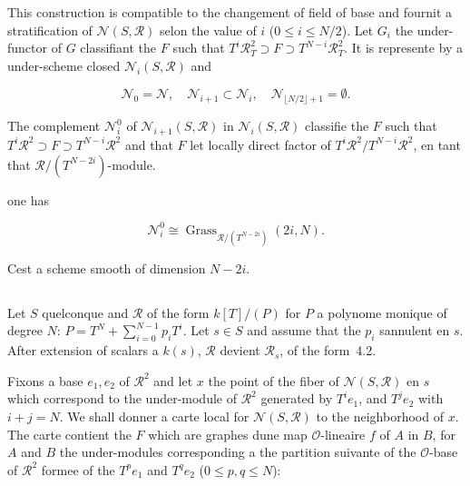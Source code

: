 \documentclass[11pt,a4paper]{article}
\theoremstyle{plain}
\theoremstyle{definition}
\DeclareMathOperator{\Grass}{Grass}
\begin{document}
This construction is compatible to the changement of field of base and fournit
a stratification of $\mathscr{N}(S, \mathscr{R})$ selon the value of $i$ ($0 \leq i \leq N/2$). Let $G_i$ the
under-functor of $G$ classifiant the $F$ such that $T^i \mathscr{R}_T^2 \supset F \supset T^{N-i}\mathscr{R}_T^2$. It is
represente by a under-scheme closed $\mathscr{N}_i(S, \mathscr{R})$ and

\begin{equation}
\mathscr{N}_0 = \mathscr{N}, \quad \mathscr{N}_{i+1} \subset \mathscr{N}_i, \quad \mathscr{N}_{\lfloor N/2 \rfloor + 1} = \emptyset.
\end{equation}

The complement $\mathscr{N}_i^0$ of $\mathscr{N}_{i+1}(S, \mathscr{R})$ in $\mathscr{N}_i(S, \mathscr{R})$ classifie the $F$ such that
$T^i \mathscr{R}^2 \supset F \supset T^{N-i}\mathscr{R}^2$ and that $F$ let locally direct factor of $T^i\mathscr{R}^2/T^{N-i}\mathscr{R}^2$,
en tant that $\mathscr{R}/(T^{N-2i})$-module.

one has

\begin{equation}
\mathscr{N}_i^0 \cong \Grass_{\mathscr{R}/(T^{N-2i})}(2i, N).
\end{equation}

Cest a scheme smooth of dimension $N - 2i$.

\subsection{}

Let $S$ quelconque and $\mathscr{R}$ of the form $k[T]/(P)$ for $P$ a polynome monique
of degree $N$: $P = T^N + \sum_{i=0}^{N-1} p_i T^i$. Let $s \in S$ and assume that the $p_i$ sannulent en
$s$. After extension of scalars a $k(s)$, $\mathscr{R}$ devient $\mathscr{R}_s$, of the form~4.2.

Fixons a base $e_1, e_2$ of $\mathscr{R}^2$ and let $x$ the point of the fiber of $\mathscr{N}(S, \mathscr{R})$ en $s$
which correspond to the under-module of $\mathscr{R}^2$ generated by $T^i e_1$, and $T^j e_2$ with
$i + j = N$. We shall donner a carte local for $\mathscr{N}(S, \mathscr{R})$ to the neighborhood of $x$.
The carte contient the $F$ which are graphes dune map $\mathscr{O}$-lineaire $f$ of $A$
in $B$, for $A$ and $B$ the under-modules corresponding a the partition suivante of
the $\mathscr{O}$-base of $\mathscr{R}^2$ formee of the $T^p e_1$ and $T^q e_2$ ($0 \leq p, q \leq N$):
\end{document}
